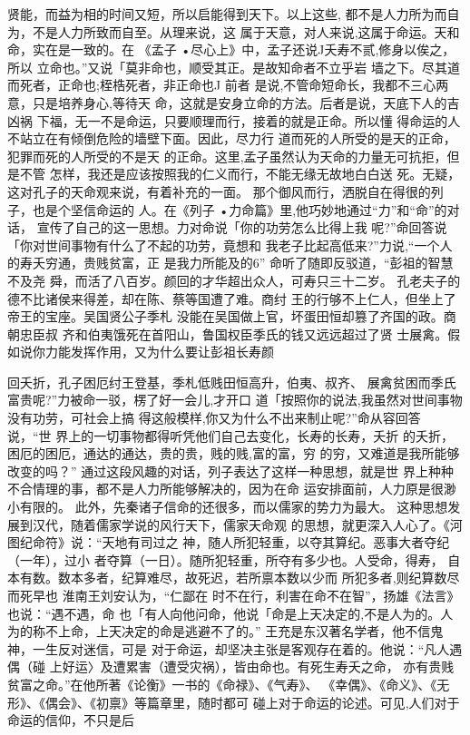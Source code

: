 贤能，而益为相的时间又短，所以启能得到天下。以上这些,
都不是人力所为而自为，不是人力所致而自至。从理来说，这
属于天意，对人来说,这属于命运。天和命，实在是一致的。在
《孟子 •尽心上》中，孟子还说J夭寿不贰,修身以俟之，所以
立命也。”又说「莫非命也，顺受其正。是故知命者不立乎岩
墙之下。尽其道而死者，正命也;桎梏死者，非正命也J 前者
是说,不管命短命长，我都不三心两意，只是培养身心,等待天
命，这就是安身立命的方法。后者是说，天底下人的吉凶祸
下福，无一不是命运，只要顺理而行，接着的就是正命。所以懂
得命运的人不站立在有倾倒危险的墙壁下面。因此，尽力行
道而死的人所受的是天的正命，犯罪而死的人所受的不是天
的正命。这里,孟子虽然认为天命的力量无可抗拒，但是不管
怎样，我还是应该按照我的仁义而行，不能无缘无故地白白送
死。无疑，这对孔子的天命观来说，有着补充的一面。
那个御风而行，洒脱自在得很的列子，也是个坚信命运的
人。在《列子 •力命篇》里,他巧妙地通过“力”和“命”的对话，
宣传了自己的这一思想。力对命说「你的功劳怎么比得上我
呢?”命回答说「你对世间事物有什么了不起的功劳，竟想和
我老子比起高低来?”力说,“一个人的寿夭穷通，贵贱贫富，正
是我力所能及的6” 命听了随即反驳道，“彭祖的智慧不及尧
舜，而活了八百岁。颜回的才华超出众人，可寿只三十二岁。
孔老夫子的德不比诸侯来得差，却在陈、蔡等国遭了难。商纣
王的行够不上仁人，但坐上了帝王的宝座。吴国贤公子季札
没能在吴国做上官，坏蛋田恒却篡了齐国的政。商朝忠臣叔
齐和伯夷饿死在首阳山，鲁国权臣季氏的钱又远远超过了贤
士展禽。假如说你力能发挥作用，又为什么要让彭祖长寿颜

回夭折，孔子困厄纣王登基，季札低贱田恒高升，伯夷、叔齐、
展禽贫困而季氏富贵呢?”力被命一驳，楞了好一会儿,才开口
道「按照你的说法,我虽然对世间事物没有功劳，可社会上搞
得这般模样,你又为什么不出来制止呢?”命从容回答说，“世
界上的一切事物都得听凭他们自己去变化，长寿的长寿，夭折
的夭折，困厄的困厄，通达的通达，贵的贵，贱的贱,富的富，穷
的穷，又难道是我所能够改变的吗？”
通过这段风趣的对话，列子表达了这样一种思想，就是世
界上种种不合情理的事，都不是人力所能够解决的，因为在命
运安排面前，人力原是很渺小有限的。
此外，先秦诸子信命的还很多，而以儒家的势力为最大。
这种思想发展到汉代，随着儒家学说的风行天下，儒家天命观
的思想，就更深入人心了。《河图纪命符》说：“天地有司过之
神，随人所犯轻重，以夺其算纪。恶事大者夺纪（一年），过小
者夺算（一日）。随所犯轻重，所夺有多少也。人受命，得寿，
自本有数。数本多者，纪算难尽，故死迟，若所禀本数以少而
所犯多者,则纪算数尽而死早也 淮南王刘安认为，“仁鄙在
时不在行，利害在命不在智”，扬雄《法言》也说：“遇不遇，命
也「有人向他问命，他说「命是上天决定的,不是人为的。人
为的称不上命，上天决定的命是逃避不了的。”
王充是东汉著名学者，他不信鬼神，一生反对迷信，可是
对于命运，却坚决主张是客观存在着的。他说：“凡人遇偶（碰
上好运〉及遭累害（遭受灾祸），皆由命也。有死生寿夭之命，
亦有贵贱贫富之命。”在他所著《论衡》一书的《命禄》、《气寿》、
《幸偶》、《命义》、《无形》、《偶会》、《初禀》等篇章里，随时都可
碰上对于命运的论述。可见,人们对于命运的信仰，不只是后

